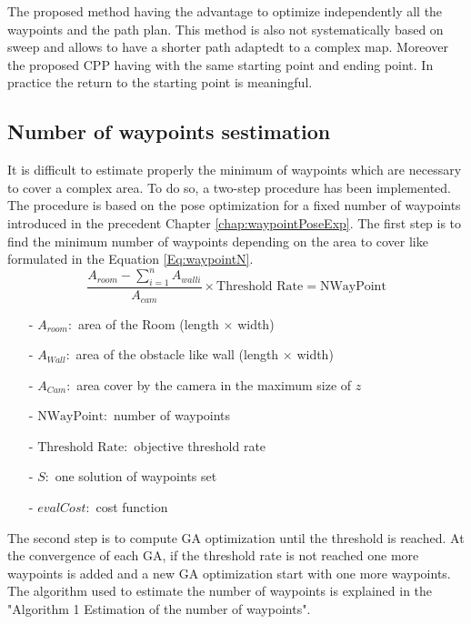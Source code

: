 The proposed method having the advantage to optimize independently all the waypoints and the path plan. This method is also not systematically based on sweep and allows to have a shorter path adaptedt to a complex map. Moreover the proposed CPP having with the same starting point and ending point. In practice the return to the starting point is meaningful. 


\subsection{Number of waypoints sestimation}\label{sec:NmbWaypoint}

It is difficult to estimate properly the minimum of waypoints which are necessary to cover a complex area.
To do so, a two-step procedure has been implemented. The procedure is based on the pose optimization for a fixed number of waypoints introduced in the precedent Chapter \ref{chap:waypointPoseExp}. 
The first step is to find the minimum number of waypoints depending on the area to cover like formulated in the
 Equation \ref{Eq:waypointN}. \\
\begin{equation}\label{Eq:waypointN}
\frac{ A_{room} - \sum_{i=1}^n A_{wall i} }{A_{cam}} \times \mbox{Threshold Rate} = \mbox{NWayPoint}
\end{equation}

\begin{itemize}
\item[-] $ A_{room}: $  area of the Room (length $\times$ width)
\item[-] $ A_{Wall}: $  area of the obstacle like wall (length $\times$ width)
\item[-] $ A_{Cam}: $   area cover by the camera in the maximum size of $z$
\item[-] $ \mbox{NWayPoint}: $  number of waypoints
\item[-] $ \mbox{Threshold Rate}: $ objective threshold rate 
\item[-] $S:$ one solution of waypoints set 
\item[-] $evalCost:$ cost function  
\end{itemize}

The second step is to compute GA optimization until the threshold is reached. At the convergence of each GA, if the threshold rate is not reached one more waypoints is added and a new GA optimization start with one more waypoints. The algorithm used to estimate the number of waypoints is explained in the "Algorithm 1 Estimation of the number of waypoints".  

